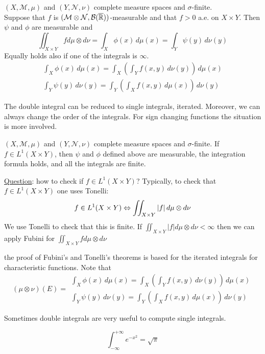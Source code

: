 \begin{theorem}
    \((X, \mathcal{M}, \mu)\) and \((Y, \mathcal{N}, \nu)\) complete measure spaces and \(\sigma\)-finite. \\
    Suppose that \(f\) is \((\mathcal{M} \otimes \mathcal{N}, \mathcal{B}(\overline{\mathbb{R}}))\)-measurable and that \(f > 0\) a.e. on \(X \times Y\). Then \(\psi\) and \(\phi\) are measurable and
    \[
        \iint_{X \times Y} f d\mu \otimes d\nu = \int_X \phi(x) \, d\mu(x) = \int_Y \psi(y) \, d\nu(y) \tag*{Integration formula}
    \]
    Equally holds also if one of the integrals is \(\infty\).
    \[
        \begin{array}{l}
            \int_X \phi(x) \, d\mu(x) = \int_X \left(\int_Y f(x, y) \, d\nu(y) \right) \, d\mu(x) \\
            \int_Y \psi(y) \, d\nu(y) = \int_Y \left(\int_X f(x, y) \, d\mu(x) \right) \, d\nu(y)      
    \end{array}  
    \]
\end{theorem}
\begin{remark}
    The double integral can be reduced to single integrals, iterated. Moreover, we can always change the order of the integrals.
    For sign changing functions the situation is more involved.
\end{remark}
\begin{theorem}
    \((X, \mathcal{M}, \mu)\) and \((Y, \mathcal{N}, \nu)\) complete measure spaces and \(\sigma\)-finite.
    If \(f \in L^1(X \times Y)\), then \(\psi\) and \(\phi\) defined above are measurable, the integration formula holds, and all the integrals are finite.
\end{theorem}
\noindent\underline{Question}: how to check if \(f\in L^1(X \times Y)\)? Typically, to check that \(f \in L^1(X \times Y)\) one uses Tonelli: 
\[
    f \in L^1(X \times Y) \Leftrightarrow \iint_{X \times Y} \abs{f} \, d\mu \otimes d\nu
\]
We use Tonelli to check that this is finite. 
If \(\iint_{X \times Y} \vert f \vert d\mu \otimes d\nu < \infty\) then we can apply Fubini for \(\iint_{X \times Y} f d\mu \otimes d\nu\)
\begin{remark}
    the proof of Fubini's and Tonelli's theorems is based for the iterated integrals for characteristic functions.
    Note that 
    \[(\mu \otimes \nu)(E) = \begin{array}{l}
        \int_X \phi(x) \, d\mu(x) = \int_X \left(\int_Y f(x, y) \, d\nu(y) \right) \, d\mu(x) \\
        \int_Y \psi(y) \, d\nu(y) = \int_Y \left(\int_X f(x, y) \, d\mu(x) \right) \, d\nu(y)
    \end{array}
    \]
\end{remark}
\begin{remark}
    Sometimes double integrals are very useful to compute single integrals.
\end{remark}
\begin{example}    
    \[\int_{-\infty}^{+\infty}e^{-x^2} = \sqrt{\pi}\]
\end{example}

